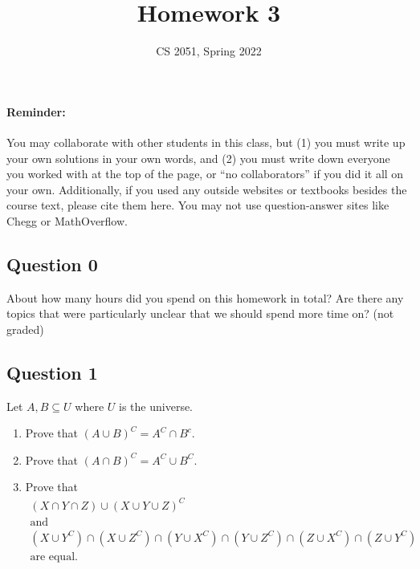 \documentclass{article}
\begin{document}
\title{Homework 3}
\author{CS 2051, Spring 2022}
\date{}
\maketitle


\paragraph{Reminder:} You may collaborate with other students in this
class, but (1) you must write up your own solutions in your own words, and (2) 
you must write down everyone you worked with at the top of the page, or ``no 
collaborators'' if you did it all on your own. Additionally, if you used any outside websites or textbooks besides the course text, please cite them here. You may not use question-answer sites like Chegg or MathOverflow. \\

\hline

\subsection*{Question 0}
About how many hours did you spend on this homework in total? Are there any topics that were particularly unclear that we should spend more time on? (not graded)

\subsection*{Question 1}
Let $A, B \subseteq U$ where $U$ is the universe. 
\begin{enumerate}
    \item Prove that $(A \cup B)^C = A^C \cap B^c$.
    \item Prove that $(A \cap B)^C = A^C \cup B^C$.
    \item Prove that
    \begin{gather*}
            (X \cap Y \cap Z) \cup (X \cup Y \cup Z)^C \\
            \text{and} \\
            (X \cup Y^C) \cap (X \cup Z^C) \cap (Y \cup X^C) \cap (Y \cup Z^C) \cap (Z \cup X^C) \cap (Z \cup Y^C) \\
            \text{are equal.}
    \end{gather*}

\end{enumerate}
\end{document}
